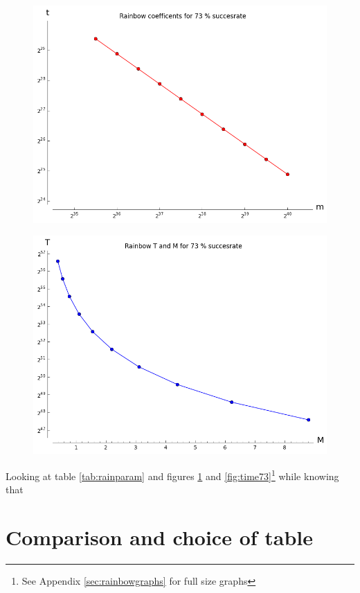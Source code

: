\begin{figure}[H]
  \centering
  \begin{minipage}{.5\textwidth}
    \centering
    \includegraphics[scale=0.3]{figures/RainbowCoef73.png}
    \label{fig:param73}
  \end{minipage}%
  \begin{minipage}{.5\textwidth}
    \centering
    \includegraphics[scale=0.3]{figures/RainbowTime73.png}
  \end{minipage}
\end{figure}

Looking at table \ref{tab:rainparam} and figures \ref{fig:param73}
and \ref{fig:time73}\footnote{See Appendix \ref{sec:rainbowgraphs} for
  full size graphs} while knowing that

\newpage
\section{Comparison and choice of table}

